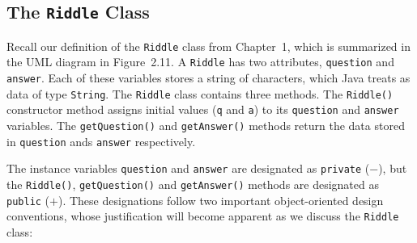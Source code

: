 \subsection{The {\tt Riddle} Class}

\noindent Recall our definition of the {\tt Riddle} class from
Chapter~1, which is summarized in the UML diagram in Figure~2.11. A
{\tt Riddle} has two attributes, {\tt question} and {\tt answer}. Each
of these variables stores a string of characters, which Java treats as
data of type {\tt String}.  The {\tt Riddle} class contains three
methods.  The {\tt Riddle()} constructor method assigns initial values
({\tt q} and {\tt a}) to its {\tt question} and {\tt answer}
variables.  The {\tt getQuestion()} and {\tt getAnswer()} methods
return the data stored in {\tt question} ands {\tt answer}
respectively.

The instance variables {\tt question} and {\tt answer} are designated
as {\tt private} ($-$), but the {\tt Riddle()}, {\tt getQuestion()}
and {\tt getAnswer()} methods are designated as {\tt public}
($+$). These designations follow two important object-oriented design
conventions, whose justification will become apparent as we
discuss the {\tt Riddle} class: 




